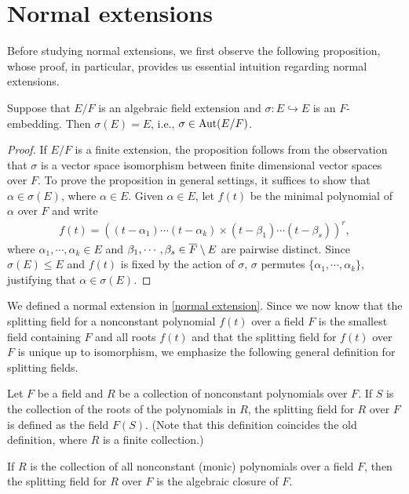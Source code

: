 \section{Normal extensions}

Before studying normal extensions, we first observe the following proposition, whose proof, in particular, provides us essential intuition regarding normal extensions.
\begin{prop}
    Suppose that $E/F$ is an algebraic field extension and $\sigma: E\hookrightarrow E$ is an $F$-embedding.
    Then $\sigma(E)=E$, i.e., $\sigma\in{\textrm{Aut}({E/F})}$.
\end{prop}
\begin{proof}
    If $E/F$ is a finite extension, the proposition follows from the observation that $\sigma$ is a vector space isomorphism between finite dimensional vector spaces over $F$.
    To prove the proposition in general settings, it suffices to show that $\alpha\in\sigma(E)$, where $\alpha\in E$.
    Given $\alpha\in E$, let $f(t)$ be the minimal polynomial of $\alpha$ over $F$ and write
    \begin{align*}
        f(t)=\left((t-\alpha_1)\cdots(t-\alpha_k)\times(t-\beta_1)\cdots(t-\beta_s)\right)^r,
    \end{align*}
    where $\alpha_1, \cdots, \alpha_k\in E$ and $\beta_1, \cdots, \beta_s\in\overline{F}\setminus E$ are pairwise distinct.
    Since $\sigma(E)\leq E$ and $f(t)$ is fixed by the action of $\sigma$, $\sigma$ permutes $\{\alpha_1, \cdots, \alpha_k\}$, justifying that $\alpha\in \sigma(E)$.
\end{proof}

We defined a normal extension in \cref{normal extension}.
Since we now know that the splitting field for a nonconstant polynomial $f(t)$ over a field $F$ is the smallest field containing $F$ and all roots $f(t)$ and that the splitting field for $f(t)$ over $F$ is unique up to isomorphism, we emphasize the following general definition for splitting fields.
\begin{defi}
    Let $F$ be a field and $R$ be a collection of nonconstant polynomials over $F$.
    If $S$ is the collection of the roots of the polynomials in $R$, the splitting field for $R$ over $F$ is defined as the field $F(S)$.
    (Note that this definition coincides the old definition, where $R$ is a finite collection.)
\end{defi}
\begin{exmp}
    If $R$ is the collection of all nonconstant (monic) polynomials over a field $F$, then the splitting field for $R$ over $F$ is the algebraic closure of $F$.
\end{exmp}

